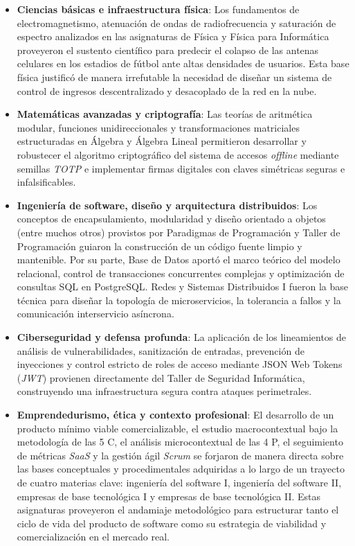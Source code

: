 \documentclass[conference, a4paper]{IEEEtran}
\begin{document}
\begin{itemize}
    \item \textbf{Ciencias b\'asicas e infraestructura f\'isica}: Los fundamentos de electromagnetismo, atenuaci\'on de ondas de radiofrecuencia y saturaci\'on de espectro analizados en las asignaturas de F\'isica y F\'isica para Inform\'atica proveyeron el sustento cient\'ifico para predecir el colapso de las antenas celulares en los estadios de f\'utbol ante altas densidades de usuarios. Esta base f\'isica justific\'o de manera irrefutable la necesidad de dise\~nar un sistema de control de ingresos descentralizado y desacoplado de la red en la nube.
    \item \textbf{Matem\'aticas avanzadas y criptograf\'ia}: Las teor\'ias de aritm\'etica modular, funciones unidireccionales y transformaciones matriciales estructuradas en \'Algebra y \'Algebra Lineal permitieron desarrollar y robustecer el algoritmo criptogr\'afico del sistema de accesos \textit{offline} mediante semillas \textit{TOTP} e implementar firmas digitales con claves sim\'etricas seguras e infalsificables.
    \item \textbf{Ingenier\'ia de software, dise\~no y arquitectura distribuidos}: Los conceptos de encapsulamiento, modularidad y dise\~no orientado a objetos (entre muchos otros) provistos por Paradigmas de Programaci\'on y Taller de Programaci\'on guiaron la construcci\'on de un c\'odigo fuente limpio y mantenible. Por su parte, Base de Datos aport\'o el marco te\'orico del modelo relacional, control de transacciones concurrentes complejas y optimizaci\'on de consultas SQL en PostgreSQL. Redes y Sistemas Distribuidos I fueron la base t\'ecnica para dise\~nar la topolog\'ia de microservicios, la tolerancia a fallos y la comunicaci\'on interservicio as\'incrona.
    \item \textbf{Ciberseguridad y defensa profunda}: La aplicaci\'on de los lineamientos de an\'alisis de vulnerabilidades, sanitizaci\'on de entradas, prevenci\'on de inyecciones y control estricto de roles de acceso mediante JSON Web Tokens (\textit{JWT}) provienen directamente del Taller de Seguridad Inform\'atica, construyendo una infraestructura segura contra ataques perimetrales.
    \item \textbf{Emprendedurismo, \'etica y contexto profesional}: El desarrollo de un producto m\'inimo viable comercializable, el estudio macrocontextual bajo la metodolog\'ia de las 5 C, el an\'alisis microcontextual de las 4 P, el seguimiento de m\'etricas \textit{SaaS} y la gesti\'on \'agil \textit{Scrum} se forjaron de manera directa sobre las bases conceptuales y procedimentales adquiridas a lo largo de un trayecto de cuatro materias clave: ingenier\'ia del software I, ingenier\'ia del software II, empresas de base tecnol\'ogica I y empresas de base tecnol\'ogica II. Estas asignaturas proveyeron el andamiaje metodol\'ogico para estructurar tanto el ciclo de vida del producto de software como su estrategia de viabilidad y comercializaci\'on en el mercado real.
\end{itemize}
\end{document}
